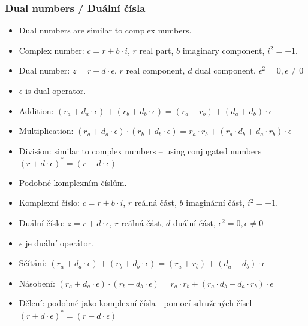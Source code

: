 \begin{frame}\frametitle{Dual numbers / Duální čísla}\scriptsize
	\begin{itemize}
	\item Dual numbers are similar to complex numbers.
  \item Complex number: $c = r+b \cdot i$, $r$ real part, $b$ imaginary component, $i^2 = -1$.
  \item Dual number: $z = r + d \cdot \epsilon$, $r$ real component, $d$ dual component, $\epsilon^2 = 0, \epsilon \neq 0$
  \item $\epsilon$ is dual operator.
  \item Addition: $(r_a + d_a \cdot \epsilon) + (r_b + d_b \cdot \epsilon) = (r_a + r_b) + (d_a + d_b) \cdot \epsilon$
  \item Multiplication: $(r_a + d_a \cdot \epsilon) \cdot (r_b + d_b \cdot \epsilon) = r_a \cdot r_b + (r_a \cdot d_b + d_a \cdot r_b) \cdot \epsilon $
  \item Division: similar to complex numbers -- using conjugated numbers $(r + d \cdot \epsilon)^* = (r - d \cdot \epsilon)$
	\end{itemize}

	\begin{itemize}
	\item Podobné komplexním číslům.
  \item Komplexní číslo: $c = r+b \cdot i$, $r$ reálná část, $b$ imaginární část, $i^2 = -1$.
  \item Duální číslo: $z = r + d \cdot \epsilon$, $r$ reálná část, $d$ duální část, $\epsilon^2 = 0, \epsilon \neq 0$
  \item $\epsilon$ je duální operátor.
  \item Sčítání: $(r_a + d_a \cdot \epsilon) + (r_b + d_b \cdot \epsilon) = (r_a + r_b) + (d_a + d_b) \cdot \epsilon$
  \item Násobení: $(r_a + d_a \cdot \epsilon) \cdot (r_b + d_b \cdot \epsilon) = r_a \cdot r_b + (r_a \cdot d_b + d_a \cdot r_b) \cdot \epsilon $
  \item Dělení: podobně jako komplexní čísla - pomocí sdružených čísel $(r + d \cdot \epsilon)^* = (r - d \cdot \epsilon)$
	\end{itemize}
\end{frame}


